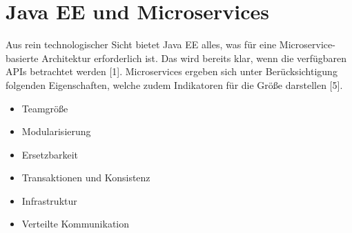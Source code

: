 \section{Java EE und Microservices}
Aus rein technologischer Sicht bietet Java EE alles, was für eine Microservice-basierte Architektur erforderlich ist. Das wird bereits klar, wenn die verfügbaren APIs betrachtet werden [1]. Microservices ergeben sich unter Berücksichtigung folgenden Eigenschaften, welche zudem Indikatoren für die Größe darstellen [5].

\begin{itemize}
	\item Teamgröße
	\item Modularisierung
	\item Ersetzbarkeit
	\item Transaktionen und Konsistenz
	\item Infrastruktur
	\item Verteilte Kommunikation	
\end{itemize}

